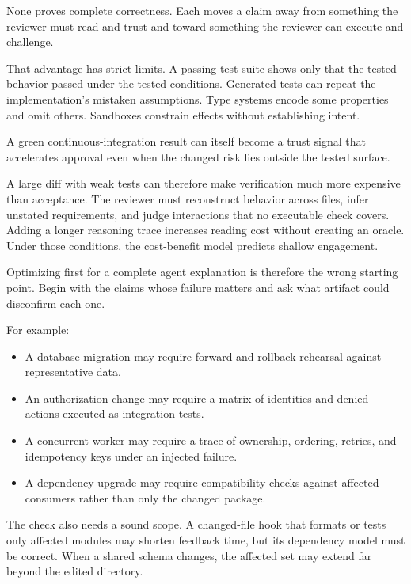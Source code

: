 None proves complete correctness. Each moves a claim away from something the reviewer must read and trust and toward something the reviewer can execute and challenge.

That advantage has strict limits. A passing test suite shows only that the tested behavior passed under the tested conditions. Generated tests can repeat the implementation's mistaken assumptions. Type systems encode some properties and omit others. Sandboxes constrain effects without establishing intent.

A green continuous-integration result can itself become a trust signal that accelerates approval even when the changed risk lies outside the tested surface.

A large diff with weak tests can therefore make verification much more expensive than acceptance. The reviewer must reconstruct behavior across files, infer unstated requirements, and judge interactions that no executable check covers. Adding a longer reasoning trace increases reading cost without creating an oracle. Under those conditions, the cost-benefit model predicts shallow engagement.

Optimizing first for a complete agent explanation is therefore the wrong starting point. Begin with the claims whose failure matters and ask what artifact could disconfirm each one.


For example:

\begin{itemize}
\tightlist
\item
  A database migration may require forward and rollback rehearsal against representative data.
\item
  An authorization change may require a matrix of identities and denied actions executed as integration tests.
\item
  A concurrent worker may require a trace of ownership, ordering, retries, and idempotency keys under an injected failure.
\item
  A dependency upgrade may require compatibility checks against affected consumers rather than only the changed package.
\end{itemize}

The check also needs a sound scope. A changed-file hook that formats or tests only affected modules may shorten feedback time, but its dependency model must be correct. When a shared schema changes, the affected set may extend far beyond the edited directory.

